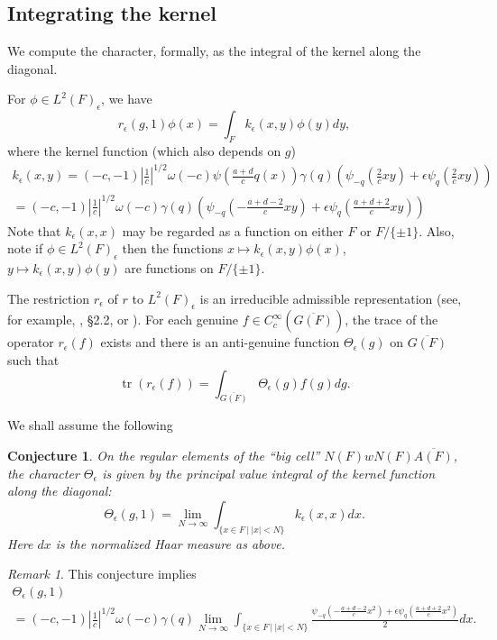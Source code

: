 \documentclass[12pt,letterpaper]{book}
\theoremstyle{plain}
\newtheorem{conjecture}[theorem]{Conjecture}
\theoremstyle{definition}
\theoremstyle{remark}
\newtheorem{remark}[theorem]{Remark}
\theoremstyle{remark}
\newcommand{\tr}{\operatorname{tr}}
\begin{document}
\subsection{Integrating the kernel}

We compute the character, formally, as the integral of the kernel along the diagonal.


For $\phi\in L^2(F)_\epsilon$, we have
\[
r_\epsilon(g,1)\phi(x)=
\int_{F}
k_\epsilon (x,y)\phi(y)dy,
\]
where the kernel function (which also depends on $g$)
\[
\begin{array}{c}
k_\epsilon (x,y)=
(-c,-1)|{\frac{1}{c}}|^{1/2}
\omega(-c)\psi({\frac{a+d}{c}}q(x))
\gamma(q)(\psi_{-q}({\frac{2}{c}}xy)+\epsilon \psi_q({\frac{2}{c}}xy))\\
=(-c,-1)|{\frac{1}{c}}|^{1/2}
\omega(-c)\gamma(q)
(\psi_{-q}(-{\frac{a+d-2}{c}}xy)+\epsilon \psi_q({\frac{a+d+2}{c}}xy))
\end{array}
\]
Note that $k_\epsilon(x,x)$ may be regarded as a function on either
$F$ or $F/\{\pm 1\}$.
Also, note if $\phi\in L^2(F)_\epsilon$ then
the functions $x\longmapsto k_\epsilon(x,y)\phi(x)$,
$y\longmapsto k_\epsilon(x,y)\phi(y)$ are
functions on $F/\{\pm 1\}$.

The restriction $r_\epsilon$ of $r$ to $L^2(F)_\epsilon$
is an irreducible admissible representation (see, for example,
\cite{Fl}, \S 2.2, or \cite{Ge2}). For each genuine $f\in C_c^\infty(\overline{G(F)})$,
the trace of the operator $r_\epsilon(f)$ exists and there is an
anti-genuine function $\Theta_\epsilon(g)$ on $\overline{G(F)}$
such that
\[
\tr(r_\epsilon(f))=\int_{\overline{G(F)}} \Theta_\epsilon (g)f(g)dg.
\]

We shall assume the following

\begin{conjecture}
On the regular elements of the ``big cell''
$N(F)wN(F)\overline{A(F)}$, the character $\Theta_\epsilon$
is given by the principal
value integral of the kernel function along the diagonal:
\[
\Theta_\epsilon(g,1)=
\lim_{N\rightarrow \infty}
\int_{\{x\in F\ |\ |x|<N\}}
k_\epsilon(x,x)dx.
\]
Here $dx$ is the normalized Haar measure as above.
\end{conjecture}

\begin{remark} This conjecture implies
\[
\begin{array}{c}
\Theta_\epsilon(g,1)\\
=(-c,-1)|{\frac{1}{c}}|^{1/2}\omega(-c)\gamma(q)
\lim_{N\rightarrow \infty}
\int_{\{x\in F\ |\ |x|<N\}}
{\frac{\psi_{-q}(-{\frac{a+d-2}{c}}x^2)
+\epsilon \psi_q({\frac{a+d+2}{c}}x^2)}{2}}dx.
\end{array}
\]
\end{remark}
\end{document}

